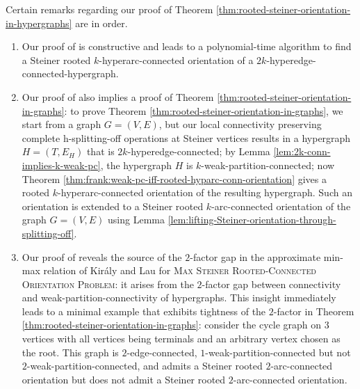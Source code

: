 \begin{remark}
Certain remarks regarding our proof of Theorem \ref{thm:rooted-steiner-orientation-in-hypergraphs} are in order.
\begin{enumerate}
\item Our proof of  is constructive and leads to a polynomial-time algorithm to find a Steiner rooted $k$-hyperarc-connected orientation of a $2k$-hyperedge-connected-hypergraph. 
\item Our proof of  also implies a proof of Theorem \ref{thm:rooted-steiner-orientation-in-graphs}: to prove Theorem \ref{thm:rooted-steiner-orientation-in-graphs}, we start from a graph $G=(V, E)$, but our local connectivity preserving complete h-splitting-off operations at Steiner vertices results in a hypergraph $H=(T, E_H)$ that is $2k$-hyperedge-connected; by Lemma \ref{lem:2k-conn-implies-k-weak-pc}, the hypergraph $H$ is $k$-weak-partition-connected;   
now Theorem \ref{thm:frank:weak-pc-iff-rooted-hyparc-conn-orientation} gives a rooted $k$-hyperarc-connected orientation of the resulting hypergraph. Such an orientation is extended to a Steiner rooted $k$-arc-connected orientation of the graph $G=(V, E)$ using Lemma \ref{lem:lifting-Steiner-orientation-through-splitting-off}. 
\item Our proof of  reveals the source of the $2$-factor gap in the approximate min-max relation of Kir\'{a}ly and Lau for \textsc{Max Steiner Rooted-Connected Orientation Problem}: it arises from the $2$-factor gap between connectivity and weak-partition-connectivity of hypergraphs. This insight immediately leads to a minimal example that exhibits tightness of the $2$-factor in Theorem %
\ref{thm:rooted-steiner-orientation-in-graphs}: consider the cycle graph on $3$ vertices with all vertices being terminals and an arbitrary vertex chosen as the root. This graph is $2$-edge-connected, $1$-weak-partition-connected but not $2$-weak-partition-connected, and admits a Steiner rooted $2$-arc-connected orientation but does not admit a Steiner rooted $2$-arc-connected orientation. 
\end{enumerate}
\end{remark}

